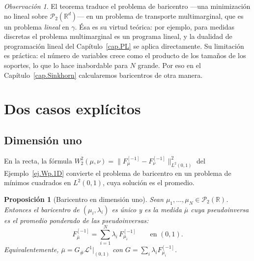 \documentclass[12pt, a4paper]{amsbook}
\newcommand{\R}{{\mathbb R}}
\newtheorem{prop}[teo]{Proposición}
\theoremstyle{remark}
\newtheorem{obs}[teo]{Observación}
\theoremstyle{definition}
\numberwithin{section}{chapter}
\numberwithin{subsection}{section}
\numberwithin{equation}{section}
\numberwithin{figure}{chapter}
\begin{document}
\begin{obs}
El teorema traduce el problema de baricentro —una minimización no lineal
sobre $\mathcal P_2(\R^d)$— en un problema de transporte multimarginal, que es
un problema \emph{lineal} en $\gamma$. Ésa es su virtud teórica: por ejemplo,
para medidas discretas el problema multimarginal es un programa lineal, y la
dualidad de programación lineal del Capítulo~\ref{cap.PL} se aplica directamente. Su
limitación es práctica: el número de variables crece como el producto de los
tamaños de los soportes, lo que lo hace inabordable para $N$ grande. Por eso
en el Capítulo~\ref{cap.Sinkhorn} calcularemos baricentros de otra manera.
\end{obs}

\section{Dos casos explícitos}\label{sec.bar.ejemplos}

\subsection{Dimensión uno}

En la recta, la fórmula $W_2^2(\mu,\nu)=\|F_\mu^{[-1]}-F_\nu^{[-1]}\|_{L^2(0,1)}^2$
del Ejemplo~\ref{ej.Wp.1D} convierte el problema de baricentro en un problema
de mínimos cuadrados en $L^2(0,1)$, cuya solución es el promedio.

\begin{prop}[Baricentro en dimensión uno]\label{prop.bar.1D}
Sean $\mu_1,\dots,\mu_N\in\mathcal P_2(\R)$. Entonces el baricentro de
$(\mu_i,\lambda_i)$ es único y es la medida $\bar\mu$ cuya pseudoinversa es el
promedio ponderado de las pseudoinversas:
\[
F_{\bar\mu}^{[-1]}=\sum_{i=1}^N\lambda_i\,F_{\mu_i}^{[-1]}
\qquad\text{en }(0,1).
\]
Equivalentemente, $\bar\mu=G_\#\mathcal L^1|_{(0,1)}$ con $G=\sum_i\lambda_iF_{\mu_i}^{[-1]}$.
\end{prop}
\end{document}
